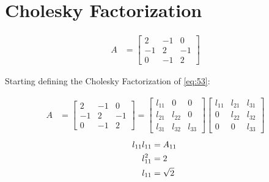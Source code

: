 \section{Cholesky Factorization}
		
	\begin{align}
		A &= \begin{bmatrix}
				2 & -1 & 0 \\[0.3em]
				-1 & 2 & -1 \\[0.3em]
				0 & -1 & 2
			\end{bmatrix}&
	\label{eq:53}
	\end{align}

	Starting defining the Cholesky Factorization of \cref{eq:53}:

	\begin{align}
		A &= \begin{bmatrix}
				2 & -1 & 0 \\[0.3em]
				-1 & 2 & -1 \\[0.3em]
				0 & -1 & 2
			\end{bmatrix}
			=
			\begin{bmatrix}
				l_{11} & 0 & 0 \\[0.3em]
				l_{21} & l_{22} & 0 \\[0.3em]
				l_{31} & l_{32} & l_{33}
			\end{bmatrix}
			\begin{bmatrix}
				l_{11} & l_{21} & l_{31} \\[0.3em]
				0 & l_{22} & l_{32} \\[0.3em]
				0 & 0 & l_{33}
			\end{bmatrix}&
	\end{align}
	\begin{align}
		l_{11}l_{11} &= A_{11}& \notag \\
		l_{11}^{2} &= 2& \notag \\
		l_{11} &= \sqrt{2}&
	\end{align}
